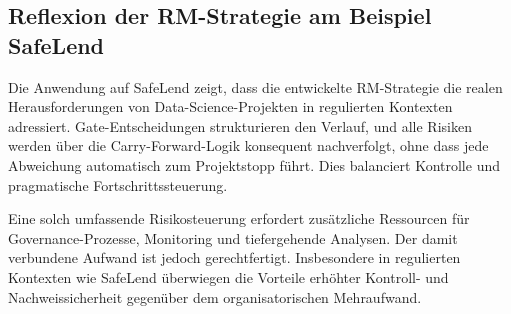 \subsection{Reflexion der RM-Strategie am Beispiel SafeLend}

Die Anwendung auf SafeLend zeigt, dass die entwickelte RM-Strategie die realen Herausforderungen von Data-Science-Projekten
in regulierten Kontexten adressiert. Gate-Entscheidungen strukturieren den Verlauf,
und alle Risiken werden über die Carry-Forward-Logik konsequent nachverfolgt, ohne dass jede Abweichung
automatisch zum Projektstopp führt. Dies balanciert Kontrolle und pragmatische Fortschrittssteuerung.

Eine solch umfassende Risikosteuerung erfordert zusätzliche Ressourcen für Governance-Prozesse, Monitoring und tiefergehende Analysen.
Der damit verbundene Aufwand ist jedoch gerechtfertigt. Insbesondere in regulierten Kontexten wie SafeLend
überwiegen die Vorteile erhöhter Kontroll- und Nachweissicherheit gegenüber dem organisatorischen Mehraufwand.